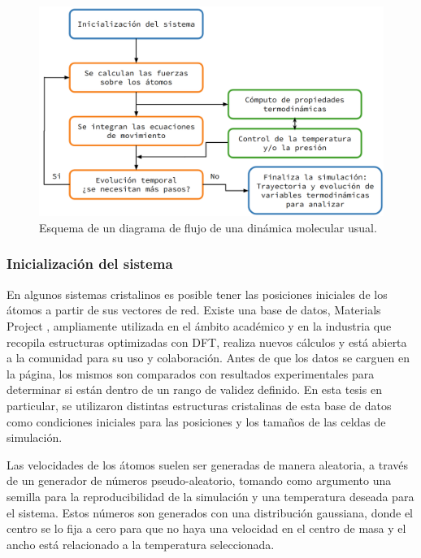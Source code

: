 \begin{figure}
    \centering
    \includegraphics[width=\textwidth]{Metodos/atomicos/esquema.png}
    \caption{Esquema de un diagrama de flujo de una dinámica molecular usual.}
    \label{fig:esquema_md}
\end{figure}


\subsubsection{Inicialización del sistema}

En algunos sistemas cristalinos es posible tener las posiciones iniciales de los
átomos a partir de sus vectores de red. Existe una base de datos, Materials
Project \cite{materials_project}, ampliamente utilizada en el ámbito académico y 
en la industria que recopila estructuras optimizadas con DFT, realiza nuevos
cálculos y está abierta a la comunidad para su uso y colaboración. Antes de que 
los datos se carguen en la página, los mismos son comparados con resultados 
experimentales para determinar si están dentro de un rango de validez definido. 
En esta tesis en particular, se utilizaron distintas estructuras cristalinas de 
esta base de datos como condiciones iniciales para las posiciones y los tamaños 
de las celdas de simulación.

Las velocidades de los átomos suelen ser generadas de manera aleatoria, a través
de un generador de números pseudo-aleatorio, tomando como argumento una semilla 
para la reproducibilidad de la simulación y una temperatura deseada para el
sistema. Estos números son generados con una distribución gaussiana, donde el 
centro se lo fija a cero para que no haya una velocidad en el centro de masa y 
el ancho está relacionado a la temperatura seleccionada.

